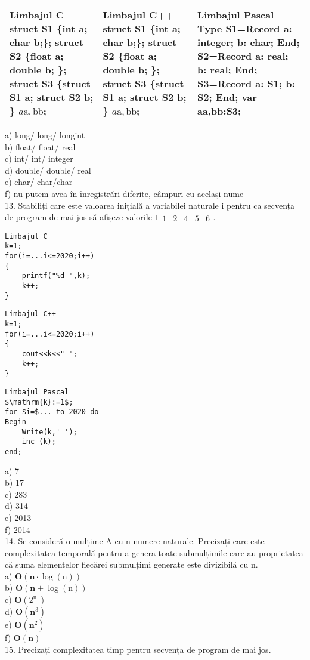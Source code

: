 \begin{center}
\begin{tabular}{|l|l|l|}
\hline
Limbajul C struct S1 \{int a; char b;\}; struct S2 \{float a; double b; \}; struct S3 \{struct S1 a; struct S2 b; \} $a \mathrm{a}, \mathrm{bb}$; & Limbajul C++ struct S1 \{int a; char b;\}; struct S2 \{float a; double b; \}; struct S3 \{struct S1 a; struct S2 b; \} $a \mathrm{a}, \mathrm{bb}$; & Limbajul Pascal Type S1=Record a: integer; b: char; End; S2=Record a: real; b: real; End; S3=Record a: S1; b: S2; End; var aa,bb:S3; \\
\hline
\end{tabular}
\end{center}

a) long/ long/ longint\\
b) float/ float/ real\\
c) int/ int/ integer\\
d) double/ double/ real\\
e) char/ char/char\\
f) nu putem avea în înregistrări diferite, câmpuri cu același nume\\
13. Stabiliți care este valoarea inițială a variabilei naturale i pentru ca secvența de program de mai jos să afișeze valorile $1 \begin{array}{llllll}1 & 2 & 4 & 5 & 6\end{array}$.

\begin{verbatim}
Limbajul C
k=1;
for(i=...i<=2020;i++)
{
    printf("%d ",k);
    k++;
}
\end{verbatim}

\begin{verbatim}
Limbajul C++
k=1;
for(i=...i<=2020;i++)
{
    cout<<k<<" ";
    k++;
}
\end{verbatim}

\begin{verbatim}
Limbajul Pascal
$\mathrm{k}:=1$;
for $i=$... to 2020 do
Begin
    Write(k,' ');
    inc (k);
end;
\end{verbatim}

a) 7\\
b) 17\\
c) 283\\
d) 314\\
e) 2013\\
f) 2014\\
14. Se consideră o mulțime A cu n numere naturale. Precizați care este complexitatea temporală pentru a genera toate submulțimile care au proprietatea că suma elementelor fiecărei submulțimi generate este divizibilă cu n.\\
a) $\mathbf{O}(\mathbf{n} \cdot \log (\mathrm{n}))$\\
b) $\mathbf{O}(\mathbf{n}+\log (\mathrm{n}))$\\
c) $\mathbf{O}\left(2^{\text {n }}\right)$\\
d) $\mathbf{O}\left(\mathbf{n}^{3}\right)$\\
e) $\mathbf{O}\left(\mathbf{n}^{2}\right)$\\
f) $\mathbf{O}(\mathbf{n})$\\
15. Precizați complexitatea timp pentru secvența de program de mai jos.

